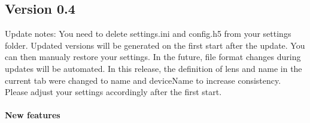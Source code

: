 \documentclass[a4paper,11pt,DIV=13]{scrartcl}
\begin{document}
\subsection{Version 0.4}
Update notes: You need to delete settings.ini and config.h5 from your settings folder. Updated versions will be generated on the first start after the update. You can then manualy restore your settings. In the future, file format changes during updates will be automated.
In this release, the definition of lens and name in the current tab were changed to name and deviceName to increase consistency. Please adjust your settings accordingly after the first start.

\paragraph{New features}
\end{document}
